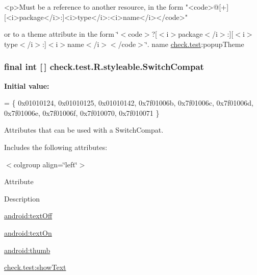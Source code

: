 \begin{DoxyVerb}      <p>Must be a reference to another resource, in the form "<code>@[+][<i>package</i>:]<i>type</i>:<i>name</i></code>"
\end{DoxyVerb}
 or to a theme attribute in the form \char`\"{}$<$code$>$?\mbox{[}$<$i$>$package$<$/i$>$\+:\mbox{]}\mbox{[}$<$i$>$type$<$/i$>$\+:\mbox{]}$<$i$>$name$<$/i$>$$<$/code$>$\char`\"{}.  name \hyperlink{namespacecheck_1_1test}{check.\+test}\+:popup\+Theme \hypertarget{classcheck_1_1test_1_1_r_1_1styleable_a0c8f3659ebec12826f8a2493fe43eaf4}{}
\subsubsection[{Switch\+Compat}]{\setlength{\rightskip}{0pt plus 5cm}final int \mbox{[}$\,$\mbox{]} check.\+test.\+R.\+styleable.\+Switch\+Compat\hspace{0.3cm}{\ttfamily [static]}}\label{classcheck_1_1test_1_1_r_1_1styleable_a0c8f3659ebec12826f8a2493fe43eaf4}
{\bfseries Initial value\+:}
\begin{DoxyCode}
= \{
            0x01010124, 0x01010125, 0x01010142, 0x7f01006b,
            0x7f01006c, 0x7f01006d, 0x7f01006e, 0x7f01006f,
            0x7f010070, 0x7f010071
        \}
\end{DoxyCode}
Attributes that can be used with a Switch\+Compat. 

Includes the following attributes\+:

\begin{TabularC}{0}
\hline
\end{TabularC}
$<$colgroup align=\char`\"{}left\char`\"{}$>$ 

Attribute

Description 

{\ttfamily \hyperlink{classcheck_1_1test_1_1_r_1_1styleable_ab84183d5d84d551d811f6b8114e6cf0c}{android\+:text\+Off}}

{\ttfamily \hyperlink{classcheck_1_1test_1_1_r_1_1styleable_a23563184e5ab5fb5a8d99269e8aba6cb}{android\+:text\+On}}

{\ttfamily \hyperlink{classcheck_1_1test_1_1_r_1_1styleable_a22ffd7de92a4d9d0703e1c36ee15e59c}{android\+:thumb}}

{\ttfamily \hyperlink{classcheck_1_1test_1_1_r_1_1styleable_a8156a68b3d19ff2ccc3cac1451ba5aa1}{check.\+test\+:show\+Text}}

